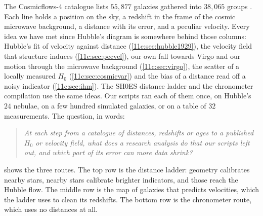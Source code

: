 The Cosmicflows-4 catalogue lists $55{,}877$ galaxies gathered into $38{,}065$
groups \cite{Tully2023CF4}. Each line holds a position on the sky, a redshift in the
frame of the cosmic microwave background, a distance with its error, and a peculiar
velocity. Every idea we have met since Hubble's diagram is somewhere behind those columns:
Hubble's fit of velocity against distance (\cref{11c:sec:hubble1929}), the velocity
field that structure induces (\cref{11c:sec:pecvel}), our own fall towards Virgo and
our motion through the microwave background (\cref{11c:sec:virgo}), the scatter of a
locally measured $H_0$ (\cref{11c:sec:cosmicvar}) and the bias of a distance read
off a noisy indicator (\cref{11c:sec:ihm}). The SH0ES distance ladder and the
chronometer compilation use the same ideas. Our scripts ran each of them once, on
Hubble's $24$ nebulae, on a few hundred simulated galaxies, or on a table of $32$
measurements. The question, in words:
\begin{quote}
\emph{At each step from a catalogue of distances, redshifts or ages to a published
$H_0$ or velocity field, what does a research analysis do that our scripts left out,
and which part of its error can more data shrink?}
\end{quote}

 shows the three routes. The top row is the distance
ladder: geometry calibrates nearby stars, nearby stars calibrate brighter
indicators, and those reach the Hubble flow. The middle row is the map of galaxies
that predicts velocities, which the ladder uses to clean its redshifts. The bottom
row is the chronometer route, which uses no distances at all.

